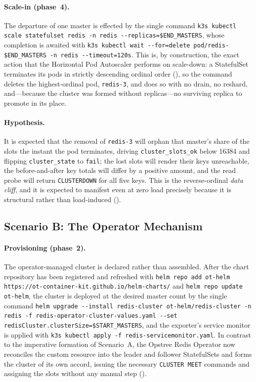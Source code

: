 \paragraph{Scale-in (phase~4).} The departure of one master is effected by the single
command \texttt{k3s kubectl scale statefulset redis -n redis -{}-replicas=\$END\_MASTERS},
whose completion is awaited with
\texttt{k3s kubectl wait -{}-for=delete pod/redis- \$END\_MASTERS -n redis -{}-timeout=120s}.
This is, by construction, the exact action that the Horizontal Pod Autoscaler performs on
scale-down: a StatefulSet terminates its pods in strictly descending ordinal order
(\cite{k8s:statefulset}), so the command deletes the highest-ordinal pod, \texttt{redis-3},
and does so with no drain, no reshard, and---because the cluster was formed without
replicas---no surviving replica to promote in its place.

\paragraph{Hypothesis.} It is expected that the removal of \texttt{redis-3} will orphan that
master's share of the slots the instant the pod terminates, driving \texttt{cluster\_slots\_ok}
below \num{16384} and flipping \texttt{cluster\_state} to \texttt{fail}; the lost slots will
render their keys unreachable, the before-and-after key totals will differ by a positive
amount, and the read probe will return \texttt{CLUSTERDOWN} for all five keys. This is the
reverse-ordinal \emph{data cliff}, and it is expected to manifest even at zero load precisely
because it is structural rather than load-induced (\cite{k8s:hpa}).

\subsection{Scenario B: The Operator Mechanism}\label{subsec:flow-operator}

\paragraph{Provisioning (phase~2).} The operator-managed cluster is declared rather than
assembled. After the chart repository has been registered and refreshed with
\texttt{helm repo add ot-helm https://ot-container-kit.github.io/helm-charts/} and
\texttt{helm repo update ot-helm}, the cluster is deployed at the desired master count by the
single command
\texttt{helm upgrade -{}-install redis-cluster ot-helm/redis-cluster -n redis -f redis-operator-cluster-values.yaml -{}-set redisCluster.clusterSize=\$START\_MASTERS},
and the exporter's service monitor is applied with
\texttt{k3s kubectl apply -f redis-servicemonitor.yaml}. In contrast to the imperative
formation of Scenario~A, the Opstree Redis Operator now reconciles the custom resource into
the leader and follower StatefulSets and forms the cluster of its own accord, issuing the
necessary \texttt{CLUSTER MEET} commands and assigning the slots without any manual step
(\cite{k8s:operator,opstree:redisoperator}).

